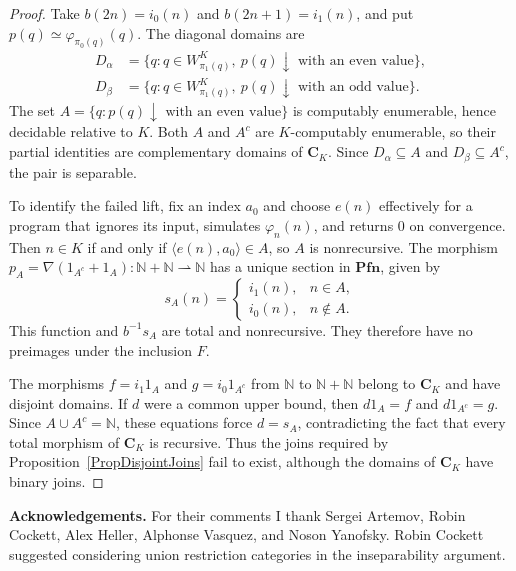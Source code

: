 \documentclass[letterpaper,10pt]{amsart}
\theoremstyle{plain}
\theoremstyle{definition}
\begin{document}
\begin{proof}
Take $b(2n)=i_0(n)$ and $b(2n+1)=i_1(n)$, and put
$p(q)\simeq\varphi_{\pi_0(q)}(q)$. The diagonal domains are
\[
\begin{aligned}
D_\alpha&=\{q:q\in W_{\pi_1(q)}^K,\ p(q)\downarrow
                   \text{ with an even value}\},\\
D_\beta&=\{q:q\in W_{\pi_1(q)}^K,\ p(q)\downarrow
                   \text{ with an odd value}\}.
\end{aligned}
\]
The set $A=\{q:p(q)\downarrow\text{ with an even value}\}$ is
computably enumerable, hence decidable relative to $K$. Both $A$ and
$A^c$ are $K$-computably enumerable, so their partial identities are
complementary domains of $\mathbf C_K$. Since
$D_\alpha\subseteq A$ and $D_\beta\subseteq A^c$, the pair is separable.

To identify the failed lift, fix an index $a_0$ and choose $e(n)$
effectively for a program that ignores its input, simulates
$\varphi_n(n)$, and returns $0$ on convergence. Then
$n\in K$ if and only if $\langle e(n),a_0\rangle\in A$, so $A$ is
nonrecursive. The morphism
$p_A=\nabla(1_{A^c}+1_A):\mathbb N+\mathbb N\rightharpoonup\mathbb N$
has a unique section in $\mathbf{Pfn}$, given by
\[
s_A(n)=
\begin{cases}
i_1(n),&n\in A,\\
i_0(n),&n\notin A.
\end{cases}
\]
This function and $b^{-1}s_A$ are total and nonrecursive. They therefore
have no preimages under the inclusion $F$.

The morphisms $f=i_1 1_A$ and $g=i_0 1_{A^c}$ from $\mathbb N$ to
$\mathbb N+\mathbb N$ belong to $\mathbf C_K$ and have disjoint
domains. If $d$ were a common upper bound, then $d1_A=f$ and
$d1_{A^c}=g$. Since $A\cup A^c=\mathbb N$, these equations force
$d=s_A$, contradicting the fact that every total morphism of
$\mathbf C_K$ is recursive. Thus the joins required by
Proposition~\ref{PropDisjointJoins} fail to exist, although the domains
of $\mathbf C_K$ have binary joins.
\end{proof}

\bigskip
\noindent\textbf{Acknowledgements.}
For their comments I thank Sergei Artemov, Robin Cockett, Alex Heller,
Alphonse Vasquez, and Noson Yanofsky. Robin Cockett suggested considering
union restriction categories in the inseparability argument.
\end{document}
